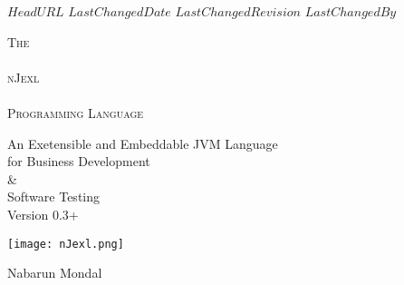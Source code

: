 \svnidlong
{$HeadURL$}
{$LastChangedDate$}
{$LastChangedRevision$}
{$LastChangedBy$}

\thispagestyle{titlepage}

\begin{center}
  \newlength{\parSepLength}
  \setlength{\parSepLength}{10ex}

  \Large
  \centering

  \thinRule\par
  \par\vspace{0.45\parSepLength}
  \begin{minipage}{\textwidth}
    \centering
    \fontsize{40pt}{30pt}\selectfont\titleColor\scshape
    The \\ ~ \\ nJexl \\ ~ \\ Programming Language  
  \end{minipage}
  \par\vspace{0.45\parSepLength}
  \par\thinRule

  \vspace{0.125\parSepLength}

  \begin{minipage}{\textwidth}
    \centering
    An Exetensible and Embeddable JVM Language \\ for Business Development \\ \& \\ Software Testing \\
    Version 0.3+
  \end{minipage}

  \vfill
 
  \begin{minipage}{0.8\textwidth}
    \centering
    \texttt{[image: nJexl.png]}
  \end{minipage}

 \vfill
 
  \begin{minipage}{\textwidth}
    \centering
    \Large
    Nabarun Mondal 
  \end{minipage}

  \vfill

 
\end{center}
